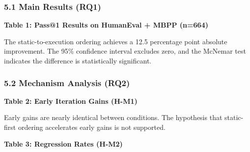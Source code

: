 
\subsubsection{5.1 Main Results (RQ1)}

\textbf{Table 1: Pass@1 Results on HumanEval + MBPP (n=664)}

\begin{table}[htbp]
\centering
{}
\end{table}

The static-to-execution ordering achieves a 12.5 percentage point absolute improvement. The 95\% confidence interval excludes zero, and the McNemar test indicates the difference is statistically significant.

\subsubsection{5.2 Mechanism Analysis (RQ2)}

\textbf{Table 2: Early Iteration Gains (H-M1)}

\begin{table}[htbp]
\centering
{}
\end{table}

Early gains are nearly identical between conditions. The hypothesis that static-first ordering accelerates early gains is not supported.

\textbf{Table 3: Regression Rates (H-M2)}

